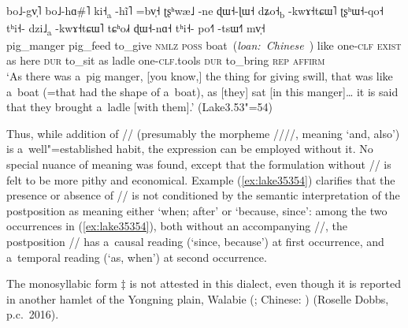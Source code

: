 \begin{exe}
	\ex
	\label{ex:lake35354}
	\\
	\gll bo˩-gv̩˥		bo˩-hɑ\#˥		ki˧\textsubscript{a}	-hĩ˥	=bv̩˧		ʈʂʰwæ˩	-ne		ɖɯ˧-ɭɯ˧		dʑo˧\textsubscript{b}	-kwɤ˧tɕɯ˥		ʈʂʰɯ˧-qo˧	tʰi˧-		dzi˩\textsubscript{a}		-kwɤ˧tɕɯ˥	tɕʰo˩˧		ɖɯ˧-nɑ˧		tʰi˧-	po˧˥	-tsɯ˧˥		mv̩˧\\
	pig\_manger		pig\_feed		to\_give	\textsc{nmlz}	\textsc{poss}		boat~(\textit{loan:~Chinese}~)		like	one-\textsc{clf}		\textsc{exist}	as			here		\textsc{dur}	to\_sit		as	ladle	one-\textsc{clf}.tools	\textsc{dur}	to\_bring		\textsc{rep}	\textsc{affirm}\\
	\glt ‘As there was a~pig manger, [you know,] the thing for giving swill, that was like a~boat (=that had the shape of a~boat), as [they] sat [in this manger]{\dots} it is said that they brought a~ladle [with them].’ (Lake3.53"=54)
\end{exe}

Thus, while addition of // (presumably the morpheme ////, meaning ‘and, also’) is
a~well"=established habit, the expression can be employed without it. No special nuance of
meaning was found, except that the formulation without // is felt to be more
pithy and economical. Example (\ref{ex:lake35354}) clarifies that the presence or absence of // is not conditioned by the semantic interpretation of the postposition as meaning either ‘when; after’ or ‘because, since’: among the two occurrences in (\ref{ex:lake35354}), both without an accompanying //, the postposition // has a~causal reading (‘since, because’) at first occurrence, and a~temporal reading (‘as, when’) at second occurrence. 

The {monosyllabic} form $\ddagger${\kern2pt} is not attested in this dialect, even though it is reported in another hamlet of the Yongning plain, Walabie (; Chinese: ) (Roselle Dobbs, p.c.\ 2016).

